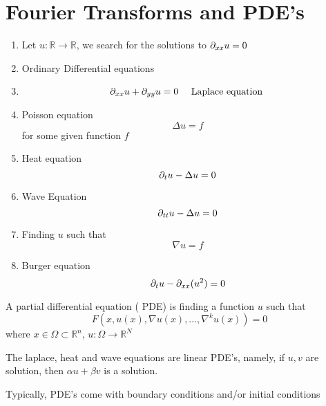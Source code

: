 \documentclass[../main.tex]{subfiles}
\begin{document}
\section{Fourier Transforms and PDE's}
\begin{exemple}
\begin{enumerate}
\item Let $u: \mathbb{R}\to \mathbb{R}$, we search for the solutions to $\partial_{xx} u =0$ 
\item Ordinary Differential equations
\item 
	\[ 
	\partial_{xx} u + \partial_{yy} u =0 \quad \text{ Laplace equation } 
	\]


\item Poisson equation
	\[ 
	\Delta u = f
	\]
	for some given function $f$ 
\item Heat equation
	\[ 
	\partial_t u - \Delta u =0
	\]
	
\item Wave Equation
	\[ 
	\partial_{tt} u - \Delta u =0
	\]
	
\item Finding $u$ such that
	\[ 
	\nabla u = f
	\]
	
\item Burger equation
\[ 
\partial_t u - \partial_{xx} ( u^{2}) =0
\]

\end{enumerate}
\end{exemple}
\begin{defn}[PDE]
	A partial differential equation ( PDE) is finding  a function $u$ such that
	\[ 
	F( x, u( x) , \nabla u( x) , \ldots, \nabla^{k} u( x) ) =0
	\]
	where $x \in \Omega \subset  \mathbb{R}^n$, $u: \Omega \to \mathbb{R}^{N}$ 
\end{defn}
\begin{rmq}
The laplace, heat and wave equations are linear PDE's, namely, if $u,v$ are solution, then $ \alpha u + \beta v$ is a solution.	
\end{rmq}
Typically, PDE's come with boundary conditions and/or initial conditions
\end{document}
